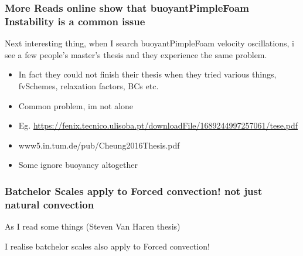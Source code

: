 \documentclass[12pt]{article}
\renewcommand{\_}{\kern-1.5pt\textunderscore\kern-1.5pt}
\begin{document}
\subsubsection{More Reads online show that buoyantPimpleFoam Instability is a common issue}

Next interesting thing, when I search buoyantPimpleFoam velocity oscillations, i see a few people’s master’s thesis and they experience the same problem.\par


\begin{itemize}
	\item In fact they could not finish their thesis when they tried various things, fvSchemes, relaxation factors, BCs etc.\par

	\item Common problem, im not alone\par

	\item Eg. \href{https://fenix.tecnico.ulisoba.pt/downloadFile/1689244997257061/tese.pdf}{https://fenix.tecnico.ulisoba.pt/downloadFile/1689244997257061/tese.pdf}\par

	\item www5.in.tum.de/pub/Cheung2016\_Thesis.pdf\par

	\item Some ignore buoyancy altogether\par
\end{itemize}

\subsubsection{Batchelor Scales apply to Forced convection! not just natural convection}
As I read some things (Steven Van Haren thesis)\par

I realise batchelor scales also apply to Forced convection!\par
\end{document}
